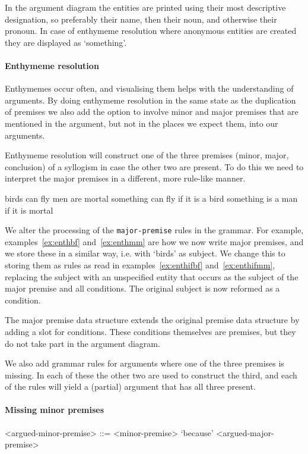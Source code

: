 In the argument diagram the entities are printed using their most descriptive designation, so preferably their name, then their noun, and otherwise their pronoun. In case of enthymeme resolution where anonymous entities are created they are displayed as `something'.

\paragraph{Enthymeme resolution}
Enthymemes occur often, and visualising them helps with the understanding of arguments. By doing enthymeme resolution in the same state as the duplication of premises we also add the option to involve minor and major premises that are mentioned in the argument, but not in the places we expect them, into our arguments.

Enthymeme resolution will construct one of the three premises (minor, major, conclusion) of a syllogism in case the other two are present. To do this we need to interpret the major premises in a different, more rule-like manner.

\begin{exe}
    \ex\label{ex:enthbf} birds can fly
    \ex\label{ex:enthmm} men are mortal
    \ex\label{ex:enthifbf} something can fly if it is a bird
    \ex\label{ex:enthifmm} something is a man if it is mortal
\end{exe}

We alter the processing of the \texttt{major-premise} rules in the grammar. For example, examples~\ref{ex:enthbf} and~\ref{ex:enthmm} are how we now write major premises, and we store these in a similar way, i.e. with `birds' as subject. We change this to storing them as rules as read in examples~\ref{ex:enthifbf} and~\ref{ex:enthifmm}, replacing the subject with an unspecified entity that occurs as the subject of the major premise and all conditions. The original subject is now reformed as a condition.

The major premise data structure extends the original premise data structure by adding a slot for conditions. These conditions themselves are premises, but they do not take part in the argument diagram.

We also add grammar rules for arguments where one of the three premises is missing. In each of these the other two are used to construct the third, and each of the rules will yield a (partial) argument that has all three present.

\paragraph{Missing minor premises}
\begin{grammar}
<argued-minor-premise> ::= <minor-premise> `because' <argued-major-premise> %
\end{grammar}

